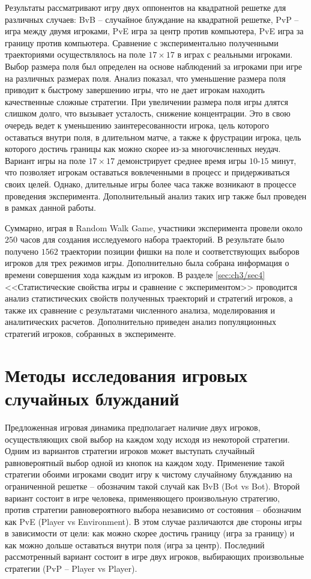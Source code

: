 Результаты рассматривают игру двух оппонентов на квадратной решетке для различных случаев: BvB -- случайное блуждание на квадратной решетке, PvP -- игра между двумя игроками, PvE игра за центр против компьютера, PvE игра за границу против компьютера. Сравнение с экспериментально полученными траекториями осуществлялось на поле $17 \times 17$ в играх с реальными игроками. Выбор размера поля был определен на основе наблюдений за игроками при игре на различных размерах поля. Анализ показал, что уменьшение размера поля приводит к быстрому завершению игры, что не дает игрокам находить качественные сложные стратегии. При увеличении размера поля игры длятся слишком долго, что вызывает усталость, снижение концентрации. Это в свою очередь ведет к уменьшению заинтересованности игрока, цель которого оставаться внутри поля, в длительном матче, а также к фрустрации игрока, цель которого достичь границы как можно скорее из-за многочисленных неудач. Вариант игры на поле $17 \times 17$ демонстрирует среднее время игры $10$-$15$ минут, что позволяет игрокам оставаться вовлеченными в процесс и придерживаться своих целей. Однако, длительные игры более часа также возникают в процессе проведения эксперимента. Дополнительный анализ таких игр также был проведен в рамках данной работы.

Суммарно, играя в Random Walk Game, участники эксперимента провели около $250$ часов для создания исследуемого набора траекторий. В результате было получено $1562$ траектории позиции фишки на поле и соответствующих выборов игроков для трех режимов игры. Дополнительно была собрана информация о времени совершения хода каждым из игроков. В разделе \cref{sec:ch3/sec4} <<Статистические свойства игры и сравнение с экспериментом>> проводится анализ статистических свойств полученных траекторий и стратегий игроков, а также их сравнение с результатами численного анализа, моделирования и аналитических расчетов. Дополнительно приведен анализ популяционных стратегий игроков, собранных в эксперименте.

\section{Методы исследования игровых случайных блужданий}\label{sec:ch3/sec2}

Предложенная игровая динамика предполагает наличие двух игроков, осуществляющих свой выбор на каждом ходу исходя из некоторой стратегии. Одним из вариантов стратегии игроков может выступать случайный равновероятный выбор одной из кнопок на каждом ходу. Применение такой стратегии обоими игроками сводит игру к чистому случайному блужданию на ограниченной решетке -- обозначим такой случай как BvB (Bot vs Bot). Второй вариант состоит в игре человека, применяющего произвольную стратегию, против стратегии равновероятного выбора независимо от состояния -- обозначим как PvE (Player vs Environment). В этом случае различаются две стороны игры в зависимости от цели: как можно скорее достичь границу (игра за границу) и как можно дольше оставаться внутри поля (игра за центр). Последний рассмотренный вариант состоит в игре двух игроков, выбирающих произвольные стратегии (PvP -- Player vs Player).

